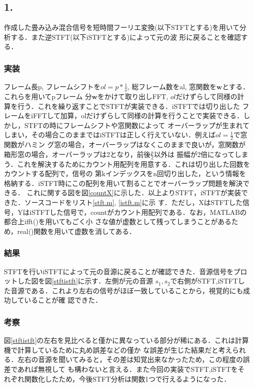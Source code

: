 \documentclass[a4j]{jarticle}
\begin{document}
\subsection{1.}
作成した畳み込み混合信号を短時間フーリエ変換(以下STFTとする)を用いて分析する．また逆STFT(以下iSTFTとする)によって元の波
形に戻ることを確認する．
\subsubsection{実装}
フレーム長p, フレームシフトを$ol = p * \frac{1}{o}$, 総フレーム数をal, 窓関数を$\bm{w}$とする．これらを用いてpフレーム
分$\bm{w}$をかけて取り出しFFT, $ol$だけずらして同様の計算を行う．これを繰り返すことでSTFTが実装できる．iSTFTでは切り出した
フレームをiFFTして加算，olだけずらして同様の計算を行うことで実装できる．しかし，STFTの時にフレームシフトや窓関数によって
オーバーラップが生まれてしまい，その場合このままではiSTFTは正しく行えていない．例えば$ol = \frac{1}{2}$で窓関数がハミン
グ窓の場合，オーバーラップはなくこのままで良いが，窓関数が箱形窓の場合，オーバーラップは2となり，前後$\frac{p}{2}$以外は
振幅が2倍になってしまう．これを解決するためにカウント用配列を用意する．これは切り出した回数をカウントする配列で，信号の
第kインデックスをn回切り出した，という情報を格納する．iSTFT時にこの配列を用いて割ることでオーバーラップ問題を解決できる．
これに関する図を図\ref{countX}に示した．以上よりSTFT，iSTFTが実装できた．ソースコードをリスト\ref{stft.m}, \ref{istft.m}に示
す．ただし，XはSTFTした信号，YはiSTFTした信号で，countがカウント用配列である．なお，MATLABの都合上ifft()を用いてもごく小
さな値が虚数として残ってしまうことがあるため，real()関数を用いて虚数を消してある．

\subsubsection{結果}
STFTを行いiSTFTによって元の音源に戻ることが確認できた．音源信号をプロットした図を図\ref{stftistft}に示す．左側が元の音源
$s_1,s_2$で右側がSTFT,iSTFTした音源である．これより左右の信号がほぼ一致していることから，視覚的にも成功していることが確
認できた．
\subsubsection{考察}
図\ref{stftistft}の左右を見比べると僅かに異なっている部分が稀にある．これは計算機で計算しているために丸め誤差などの僅か
な誤差が生じた結果だと考えられる．左右の音源を聞いてみると，その差は知覚出来なかったため，この程度の誤差であれば無視して
も構わないと言える．また今回の実装でSTFT,iSTFTをそれぞれ関数化したため，今後STFT分析は関数1つで行えるようになった．
\end{document}
